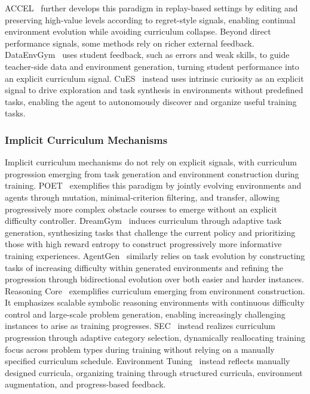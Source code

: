 \documentclass{llmxive}
\begin{document}
ACCEL~\cite{ACCEL} further develops this paradigm in replay-based settings by editing and preserving high-value levels according to regret-style signals, enabling continual environment evolution while avoiding curriculum collapse.
%
Beyond direct performance signals, some methods rely on richer external feedback.
DataEnvGym~\cite{DataEnvGym} uses student feedback, such as errors and weak skills, to guide teacher-side data and environment generation, turning student performance into an explicit curriculum signal.
CuES~\cite{CuES} instead uses intrinsic curiosity as an explicit signal to drive exploration and task synthesis in environments without predefined tasks, enabling the agent to autonomously discover and organize useful training tasks.  
%
\subsubsection{Implicit Curriculum Mechanisms}\label{sec:Implicit Curriculum Mechanisms}
Implicit curriculum mechanisms do not rely on explicit signals, with curriculum progression emerging from task generation and environment construction during training.
%
POET~\cite{POET} exemplifies this paradigm by jointly evolving environments and agents through mutation, minimal-criterion filtering, and transfer, allowing progressively more complex obstacle courses to emerge without an explicit difficulty controller.
DreamGym~\cite{DreamGym} induces curriculum through adaptive task generation, synthesizing tasks that challenge the current policy and prioritizing those with high reward entropy to construct progressively more informative training experiences.
AgentGen~\cite{AgentGen} similarly relies on task evolution by constructing tasks of increasing difficulty within generated environments and refining the progression through bidirectional evolution over both easier and harder instances.
%
Reasoning Core~\cite{Reasoning_Core} exemplifies curriculum emerging from environment construction. It emphasizes scalable symbolic reasoning environments with continuous difficulty control and large-scale problem generation, enabling increasingly challenging instances to arise as training progresses.
%
SEC~\cite{SEC} instead realizes curriculum progression through adaptive category selection, dynamically reallocating training focus across problem types during training without relying on a manually specified curriculum schedule.
%
Environment Tuning~\cite{Environment_Tuning} instead reflects manually designed curricula, organizing training through structured curricula, environment augmentation, and progress-based feedback.
%
\end{document}
